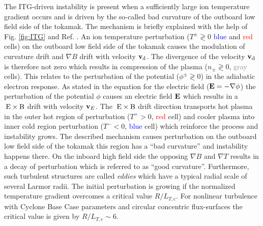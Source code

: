 The ITG-driven instability is present when a sufficiently large ion temperature gradient occurs and is driven by the so-called bad curvature of the outboard low field side of the tokamak. The mechanism is briefly explained with the help of Fig. \ref{fig:ITG} and Ref. . An ion temperature perturbation ($T^\pm \gtrless 0$ \textcolor{blue}{blue} and \textcolor{red}{red} cells) on the outboard low field side of the tokamak causes the modulation of curvature drift and $\nabla B$ drift with velocity $\boldsymbol{\mathbf{v}}_\mathrm{d}$. The divergence of the velocity $\boldsymbol{\mathbf{v}}_\mathrm{d}$ is therefore not zero which results in compression of the plasma ($n_\pm \gtrless 0$, \textcolor{gray}{gray} cells). This relates to the perturbation of the potential ($\phi^\pm  \gtrless 0$) in the adiabatic electron response. As stated in the equation for the electric field ($\boldsymbol{\mathbf{E}} = -\nabla \phi$) the perturbation of the potential $\phi$ causes an electric field $\boldsymbol{\mathbf{E}}$ which results in a $\mathrm{\:E}\times\mathrm{B}$ drift with velocity $\boldsymbol{\mathbf{v}}_E$. The $\mathrm{\:E}\times\mathrm{B}$ drift direction transports hot plasma in the outer hot region of perturbation ($T^+ > 0$, \textcolor{red}{red} cell) and cooler plasma into inner cold region perturbation ($T^- < 0$, \textcolor{blue}{blue} cell) which reinforce the process and instability grows.
\newpage
The described mechanism causes perturbation on the outboard low field side of the tokamak this region has a \enquote{bad curvature} and instability happens there. On the inboard high field side the opposing $\nabla B$ and $\nabla T$ results in a decay of perturbation which is referred to as \enquote{good curvature}. Furthermore, such turbulent structures are called \textit{eddies} which have a typical radial scale of several Larmor radii. \cite{Newins2006}
The initial perturbation is growing if the normalized temperature gradient overcomes a critical value $R/L_{T,\mathrm{c}}$. For nonlinear turbulence with Cyclone Base Case parameters and circular concentric flux-surfaces the critical value is given by $R/L_{T,\mathrm{c}} \sim 6$. \cite{Dimits2000, Isliker2010}
